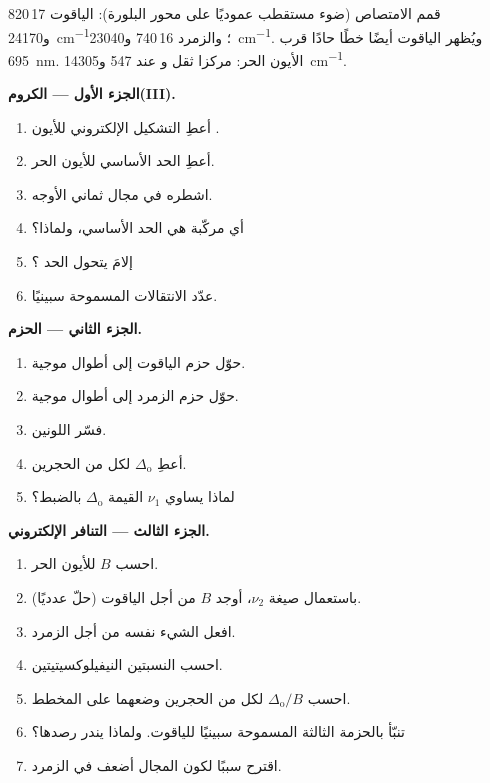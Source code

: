 \begin{problem}
\label{pb:b3:complex-spectra-magnetism:1}
قمم الامتصاص (ضوء مستقطب عموديًا على محور البلورة): الياقوت
17\,820 و\qty{24170}{cm^{-1}}؛ والزمرد 16\,740 و\qty{23040}{cm^{-1}}. ويُظهر الياقوت أيضًا خطًا
حادًا قرب \qty{695}{nm}. الأيون  الحر: مركزا ثقل  و عند 547 و\qty{14305}{cm^{-1}}.

\medskip\noindent\textbf{الجزء الأول --- الكروم(III).}
\begin{enumerate}
  \item أعطِ التشكيل الإلكتروني للأيون .
  \item أعطِ الحد الأساسي للأيون الحر.
  \item اشطره في مجال ثماني الأوجه.
  \item أي مركّبة هي الحد الأساسي، ولماذا؟
  \item إلامَ يتحول الحد ؟
  \item عدّد الانتقالات المسموحة سبينيًا.
\end{enumerate}

\medskip\noindent\textbf{الجزء الثاني --- الحزم.}
\begin{enumerate}[resume]
  \item حوّل حزم الياقوت إلى أطوال موجية.
  \item حوّل حزم الزمرد إلى أطوال موجية.
  \item فسّر اللونين.
  \item أعطِ $\Delta_{\mathrm o}$ لكل من الحجرين.
  \item لماذا يساوي $\nu_1$ القيمة $\Delta_{\mathrm o}$ بالضبط؟
\end{enumerate}

\medskip\noindent\textbf{الجزء الثالث --- التنافر الإلكتروني.}
\begin{enumerate}[resume]
  \item احسب $B$ للأيون الحر.
  \item باستعمال صيغة $\nu_2$، أوجد $B$ من أجل الياقوت (حلّ عدديًا).
  \item افعل الشيء نفسه من أجل الزمرد.
  \item احسب النسبتين النيفيلوكسيتيتين.
  \item احسب $\Delta_{\mathrm o}/B$ لكل من الحجرين وضعهما على المخطط.
  \item تنبّأ بالحزمة الثالثة المسموحة سبينيًا للياقوت. ولماذا يندر رصدها؟
  \item اقترح سببًا لكون المجال أضعف في الزمرد.
\end{enumerate}


\end{problem}
